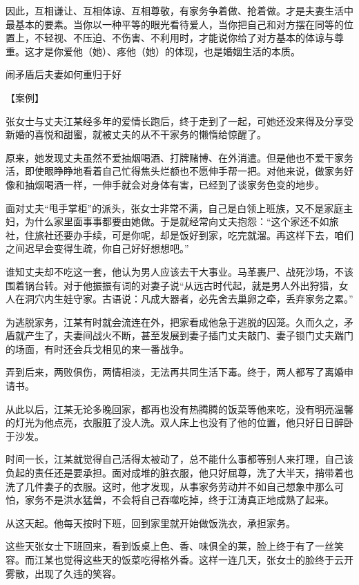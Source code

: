 \documentclass[12pt,UTF8]{ctexbook}
\begin{document}
因此，互相谦让、互相体谅、互相尊敬，有家务争着做、抢着做。才是夫妻生活中最基本的要素。当你以一种平等的眼光看待爱人，当你把自己和对方摆在同等的位置上，不轻视、不压迫、不伤害、不利用时，才能说你给了对方基本的体谅与尊重。这才是你爱他（她）、疼他（她）的体现，也是婚姻生活的本质。





闹矛盾后夫妻如何重归于好


【案例】

张女士与丈夫江某经多年的爱情长跑后，终于走到了一起，可她还没来得及分享受新婚的喜悦和甜蜜，就被丈夫的从不干家务的懒惰给惊醒了。

原来，她发现丈夫虽然不爱抽烟喝酒、打牌赌博、在外消遣。但是他也不爱干家务活，即使眼睁睁地看着自己忙得焦头烂额也不愿伸手帮一把。对他来说，做家务好像和抽烟喝酒一样，一伸手就会对身体有害，已经到了谈家务色变的地步。

面对丈夫“甩手掌柜”的派头，张女士非常不满，自己是白领上班族，又不是家庭主妇，为什么家里面事事都要由她做。于是就经常向丈夫抱怨：“这个家还不如旅社，住旅社还要办手续，可是你呢，却是饭好到家，吃完就溜。再这样下去，咱们之间迟早会变得生疏，你自己好好想想吧。”

谁知丈夫却不吃这一套，他认为男人应该去干大事业。马革裹尸、战死沙场，不该围着锅台转。对于他振振有词的对妻子说“从远古时代起，就是男人外出狩猎，女人在洞穴内生娃守家。古语说：凡成大器者，必先舍去巢卵之牵，丢弃家务之累。”

为逃脱家务，江某有时就会流连在外，把家看成他急于逃脱的囚笼。久而久之，矛盾就产生了，夫妻间战火不断，甚至发展到妻子插门丈夫敲门、妻子锁门丈夫踹门的场面，有时还会兵戈相见的来一番战争。

弄到后来，两败俱伤，两情相淡，无法再共同生活下毒。终于，两人都写了离婚申请书。

从此以后，江某无论多晚回家，都再也没有热腾腾的饭菜等他来吃，没有明亮温馨的灯光为他点亮，衣服脏了没人洗。双人床上也没有了他的位置，他只好日日醉卧于沙发。

时间一长，江某就觉得自己活得太被动了，总不能什么事都等别人来打理，自己该负起的责任还是要承担。面对成堆的脏衣服，他只好屈尊，洗了大半天，捎带着也洗了几件妻子的衣服。这时，他才发现，从事家务劳动并不如自己想象中那么可怕，家务不是洪水猛兽，不会将自己吞噬吃掉，终于江涛真正地成熟了起来。

从这天起。他每天按时下班，回到家里就开始做饭洗衣，承担家务。

这些天张女士下班回来，看到饭桌上色、香、味俱全的莱，脸上终于有了一丝笑容。而江某也觉得这些天的饭菜吃得格外香。这样一连几天，张女士的脸终于云开雾散，出现了久违的笑容。
\end{document}
